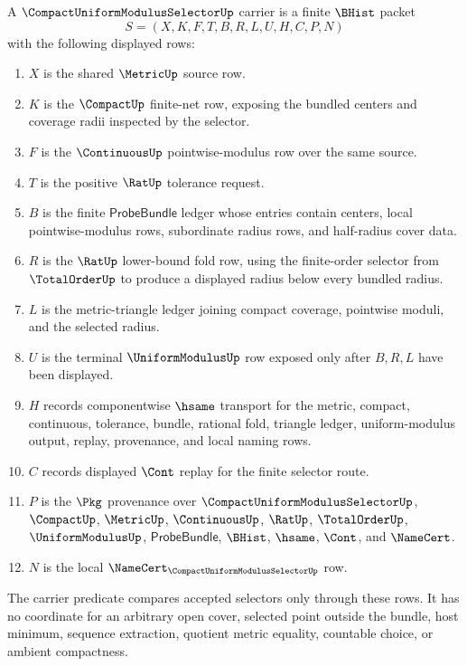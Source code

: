 \begin{definition}
\label{def:compact-uniform-modulus-selector-carrier}
A $\CompactUniformModulusSelectorUp$ carrier is a finite $\BHist$ packet
$$
S=(X,K,F,T,B,R,L,U,H,C,P,N)
$$
with the following displayed rows:
\begin{enumerate}
\item $X$ is the shared $\MetricUp$ source row.
\item $K$ is the $\CompactUp$ finite-net row, exposing the bundled centers and coverage radii inspected by the selector.
\item $F$ is the $\ContinuousUp$ pointwise-modulus row over the same source.
\item $T$ is the positive $\RatUp$ tolerance request.
\item $B$ is the finite $\mathsf{ProbeBundle}$ ledger whose entries contain centers, local pointwise-modulus rows, subordinate radius rows, and half-radius cover data.
\item $R$ is the $\RatUp$ lower-bound fold row, using the finite-order selector from $\TotalOrderUp$ to produce a displayed radius below every bundled radius.
\item $L$ is the metric-triangle ledger joining compact coverage, pointwise moduli, and the selected radius.
\item $U$ is the terminal $\UniformModulusUp$ row exposed only after $B,R,L$ have been displayed.
\item $H$ records componentwise $\hsame$ transport for the metric, compact, continuous, tolerance, bundle, rational fold, triangle ledger, uniform-modulus output, replay, provenance, and local naming rows.
\item $C$ records displayed $\Cont$ replay for the finite selector route.
\item $P$ is the $\Pkg$ provenance over $\CompactUniformModulusSelectorUp$, $\CompactUp$, $\MetricUp$, $\ContinuousUp$, $\RatUp$, $\TotalOrderUp$, $\UniformModulusUp$, $\mathsf{ProbeBundle}$, $\BHist$, $\hsame$, $\Cont$, and $\NameCert$.
\item $N$ is the local $\NameCert_{\CompactUniformModulusSelectorUp}$ row.
\end{enumerate}
The carrier predicate compares accepted selectors only through these rows. It has no coordinate for an arbitrary open cover, selected point outside the bundle, host minimum, sequence extraction, quotient metric equality, countable choice, or ambient compactness.
\end{definition}

